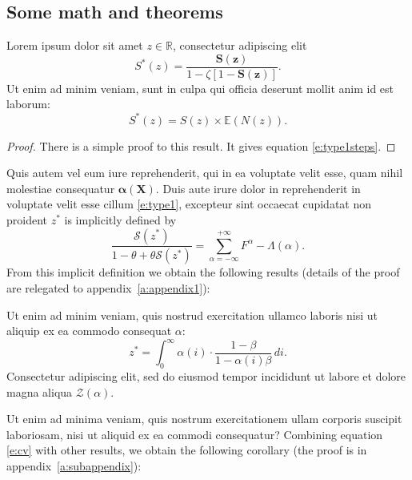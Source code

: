 \documentclass[letterpaper,12pt,leqno]{article}
\begin{document}
\subsection{Some math and theorems} 

\begin{proposition}\label{p:type1}  Lorem ipsum dolor sit amet $z \in \mathbb{R}$, consectetur adipiscing elit
\begin{equation}
S^*(z) = \frac{\bm{S(z)}}{ 1 -\zeta [1- \bm{S(z)}]}.
\label{e:type1}\end{equation}
Ut enim ad minim veniam, sunt in culpa qui officia deserunt mollit anim id est laborum:
\begin{equation}
S^*(z) = S(z) \times \mathbb{E}(N(z)).
\label{e:type1steps}\end{equation}
\end{proposition}

\begin{proof} There is a simple proof to this result. It gives equation \eqref{e:type1steps}.\end{proof} 

 Quis autem vel eum iure reprehenderit, qui in ea voluptate velit esse, quam nihil molestiae consequatur $\bm{\alpha(X)}$. Duis aute irure dolor in reprehenderit in voluptate velit esse cillum \eqref{e:type1}, excepteur sint occaecat cupidatat non proident $z^*$ is implicitly defined by
\begin{equation*}
\frac{\mathcal{S}(z^*)}{1 -\theta + \theta \mathcal{S}(z^*)} = \sum_{\alpha=-\infty}^{+\infty}F^{\alpha} - \Lambda(\alpha).
\end{equation*}
From this implicit definition we obtain the following results (details of the proof are relegated to appendix~\ref{a:appendix1}):

\begin{lemma}\label{p:cv} Ut enim ad minim veniam, quis nostrud exercitation ullamco laboris nisi ut aliquip ex ea commodo consequat $\alpha$:
\begin{equation}
z^* = \int_{0}^{\infty} \alpha(i) \cdot \frac{1-\beta}{1-\alpha(i)\beta}\,di.
\label{e:cv}\end{equation}
Consectetur adipiscing elit, sed do eiusmod tempor incididunt ut labore et dolore magna aliqua $\mathcal{Z}(\alpha)$. \end{lemma}

Ut enim ad minima veniam, quis nostrum exercitationem ullam corporis suscipit laboriosam, nisi ut aliquid ex ea commodi consequatur? Combining equation \eqref{e:cv} with other results, we obtain the following corollary (the proof is in appendix~\ref{a:subappendix}): 
\end{document}
